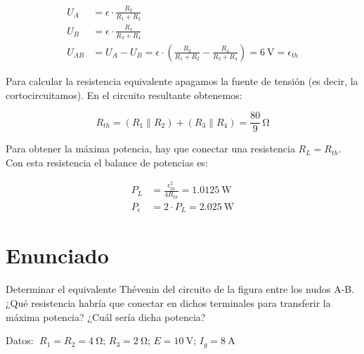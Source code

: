 \vspace{-3mm}
\begin{align*}
  U_A &= \epsilon \cdot \frac{R_2}{R_1 + R_2}\\[5pt]
  U_B &= \epsilon \cdot \frac{R_4}{R_3 + R_4}\\
  U_{AB} &= U_A - U_B = \epsilon \cdot \left( \frac{R_2}{R_1 + R_2} -  \frac{R_4}{R_3 + R_4} \right) = \boxed{\qty{6}{\volt} = \epsilon_{th}}
\end{align*}

\vspace{2mm}
Para calcular la resistencia equivalente apagamos la fuente de tensión (es decir, la cortocircuitamos). En el circuito resultante obtenemos:

\vspace{-3mm}
\begin{equation*}
  R_{th} = (R_1 \parallel R_2) + (R_3 \parallel R_4) = \boxed{\frac{80}{9} \, \si{\ohm}}
\end{equation*}

\vspace{2mm}
Para obtener la máxima potencia, hay que conectar una resistencia
$R_L = R_{th}$. Con esta resistencia el balance de potencias es:

\vspace{-5mm}
\begin{align*}
  P_L &= \frac{\epsilon_{th}^2}{4R_{th}} = \qty{1.0125}{\watt}\\[8pt]
  P_\epsilon &= 2 \cdot P_L = \qty{2.025}{\watt}
\end{align*}


\section{Enunciado}
Determinar el equivalente Thévenin del circuito de la figura entre los
nudos A-B. ¿Qué resistencia habría que conectar en dichos terminales
para transferir la máxima potencia? ¿Cuál sería dicha potencia?

\vspace{2mm}
Datos: $\; R_1 = R_2 = \qty{4}{\ohm}$;\; $R_3 = \qty{2}{\ohm}$;\; $E = \qty{10}{\volt}$;\; $I_g = \qty{8}{\ampere}$

